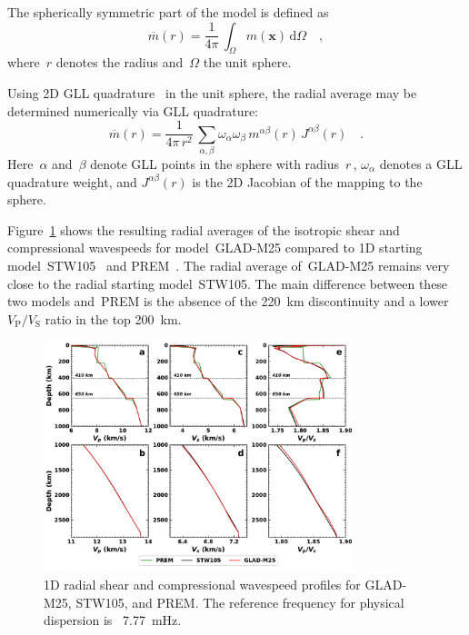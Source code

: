 The spherically symmetric part of the model is defined as
\begin{equation}
    \overline{m}(r)=\frac{1}{4\pi}\,\int_\Omega m(\mathbf{x})\,\mathrm{d} \Omega
    \quad,
\end{equation}
where~$r$ denotes the radius and~$\Omega$ the unit sphere.

Using 2D GLL quadrature~\cite{KoTr99} in the unit sphere,
the radial average may be determined numerically via GLL quadrature:
\begin{equation}
    \overline{m}(r)=\frac{1}{4\pi\,r^2}\,\sum_{\alpha,\beta}\omega_\alpha\omega_\beta\,m^{\alpha\beta}(r)\,J^{\alpha\beta}(r)
    \quad.
    \label{eq:radial_average}
\end{equation}
Here~$\alpha$ and~$\beta$ denote GLL points in the sphere with radius~$r$\,,
$\omega_\alpha$ denotes a GLL quadrature weight, and $J^{\alpha\beta}(r)$ is the 2D Jacobian of the mapping to the sphere.

Figure~\ref{fig:global-average} shows the resulting radial averages of the isotropic shear and compressional wavespeeds for model~GLAD-M25
compared to 1D starting model~STW105~\cite{kustowski2008anisotropic} and PREM~\cite{PREM}.
The radial average of~GLAD-M25 remains very close to the radial starting model~STW105.
The main difference between these two models and~PREM
is the absence of the 220~km discontinuity and a lower~$V_\text{P}/V_\text{S}$ ratio in the top 200~km.

\begin{figure}
  \centering
  \includegraphics[width=0.8\textwidth]{ch-GLADM25/figures/1d_profile.pdf}
  \caption[1D radial shear and compressional wavespeed profiles for GLAD-M25, STW105, and PREM]
  {\small{1D radial shear and compressional wavespeed profiles for GLAD-M25, STW105, and PREM.
  The reference frequency for physical dispersion is ~7.77~mHz.}}
  \label{fig:global-average}
\end{figure}

